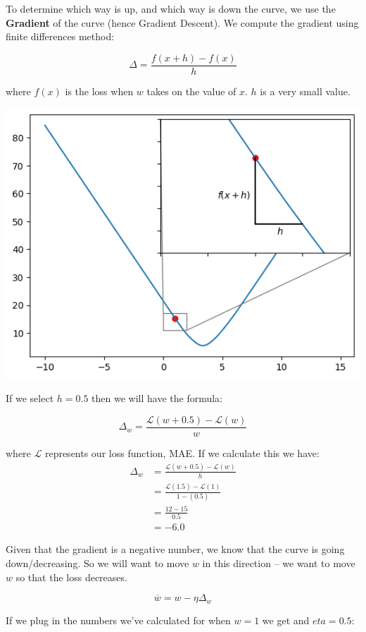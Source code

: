 \documentclass[10pt]{beamer}
\begin{document}
To determine which way is up, and which way is down the curve, we use the \textbf{Gradient} of
the curve (hence Gradient Descent). We compute the gradient using finite differences method:

\[
\Delta = \frac{f(x+h) - f(x)}{h}
\]

where \(f(x)\) is the loss when \(w\) takes on the value of \(x\). \(h\) is a very small
value.

\begin{center}
\includegraphics[width=.9\linewidth]{images/small_step.png}
\end{center}

If we select \(h = 0.5\) then we will have the formula:

\[
\Delta_w = \frac{\mathcal{L}(w + 0.5) - \mathcal{L}(w)}{w}
\]

where \(\mathcal{L}\) represents our loss function, MAE. If we calculate this we have:
\[\begin{aligned}
\Delta_w &= \frac{\mathcal{L}(w + 0.5) - \mathcal{L}(w)}{h} \\
&= \frac{\mathcal{L}(1.5)- \mathcal{L}(1)}{1  - (0.5)} \\
&= \frac{12 - 15}{0.5} \\
&= -6.0
\end{aligned}\]

Given that the gradient is a negative number, we know that the curve is going
down/decreasing. So we will want to move \(w\) in this direction -- we want to move
\(w\) so that the loss decreases.

\[
\overline{w} = w - \eta \Delta_w
\]

If we plug in the numbers we've calculated for when \(w = 1\) we get and \(eta = 0.5\):
\end{document}
